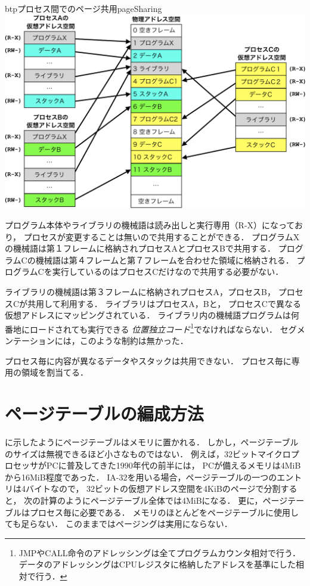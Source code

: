 \begin{myfig}{btp}{プロセス間でのページ共用}{pageSharing}
  \includegraphics[scale=0.66]{Fig/pageSharing-crop.pdf}
\end{myfig}

プログラム本体やライブラリの機械語は読み出しと実行専用（R-X）になっており，
プロセスが変更することは無いので共用することができる．
プログラムXの機械語は第１フレームに格納されプロセスAとプロセスBで共用する．
プログラムCの機械語は第４フレームと第７フレームを合わせた領域に格納される．
プログラムCを実行しているのはプロセスCだけなので共用する必要がない．

ライブラリの機械語は第３フレームに格納されプロセスA，プロセスB，
プロセスCが共用して利用する．
ライブラリはプロセスA，Bと，
プロセスCで異なる仮想アドレスにマッピングされている．
ライブラリ内の機械語プログラムは何番地にロードされても実行できる
\emph{位置独立コード}\footnote{
  JMPやCALL命令のアドレッシングは全てプログラムカウンタ相対で行う．
  データのアドレッシングはCPUレジスタに格納したアドレスを基準にした相対で行う．
}でなければならない．
セグメンテーションには，このような制約は無かった．

プロセス毎に内容が異なるデータやスタックは共用できない．
プロセス毎に専用の領域を割当てる．

\section{ページテーブルの編成方法}
に示したようにページテーブルはメモリに置かれる．
しかし，ページテーブルのサイズは無視できるほど小さなものではない．
例えば，32ビットマイクロプロセッサがPCに普及してきた1990年代の前半には，
PCが備えるメモリは4MiBから16MiB程度であった．
IA-32を用いる場合，ページテーブルの一つのエントリは4バイトなので，
32ビットの仮想アドレス空間を4KiBのページで分割すると，
次の計算のようにページテーブル全体では4MiBになる．
更に，ページテーブルはプロセス毎に必要である．
メモリのほとんどをページテーブルに使用しても足らない．
このままではページングは実用にならない．

